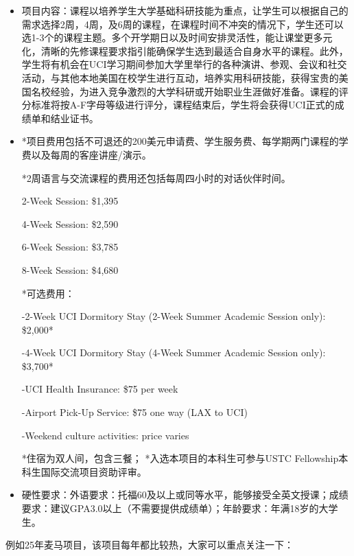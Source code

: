 \begin{presentbox}
    \begin{itemize}
        \item 项目内容：课程以培养学生大学基础科研技能为重点，让学生可以根据自己的需求选择2周，4周，及6周的课程，在课程时间不冲突的情况下，学生还可以选1-3个的课程主题。多个开学期日以及时间安排灵活性，能让课堂更多元化，清晰的先修课程要求指引能确保学生选到最适合自身水平的课程。此外，学生将有机会在UCI学习期间参加大学里举行的各种演讲、参观、会议和社交活动，与其他本地美国在校学生进行互动，培养实用科研技能，获得宝贵的美国名校经验，为进入竞争激烈的大学科研或开始职业生涯做好准备。课程的评分标准将按A-F字母等级进行评分，课程结束后，学生将会获得UCI正式的成绩单和结业证书。

        \item *项目费用包括不可退还的200美元申请费、学生服务费、每学期两门课程的学费以及每周的客座讲座/演示。
        
        *2周语言与交流课程的费用还包括每周四小时的对话伙伴时间。
        
        2-Week Session: \$1,395
        
        4-Week Session: \$2,590
        
        6-Week Session: \$3,785
        
        8-Week Session: \$4,680

        *可选费用：
        
        -2-Week UCI Dormitory Stay (2-Week Summer Academic Session only): \$2,000*
        
        -4-Week UCI Dormitory Stay (4-Week Summer Academic Session only): \$3,700*
        
        -UCI Health Insurance: \$75 per week
        
        -Airport Pick-Up Service: \$75 one way (LAX to UCI)
        
        -Weekend culture activities: price varies

        *住宿为双人间，包含三餐；
        *入选本项目的本科生可参与USTC Fellowship本科生国际交流项目资助评审。

        \item 硬性要求：外语要求：托福60及以上或同等水平，能够接受全英文授课；成绩要求：建议GPA3.0以上（不需要提供成绩单）；年龄要求：年满18岁的大学生。
    \end{itemize}
\end{presentbox}

例如25年麦马项目，该项目每年都比较热，大家可以重点关注一下：

